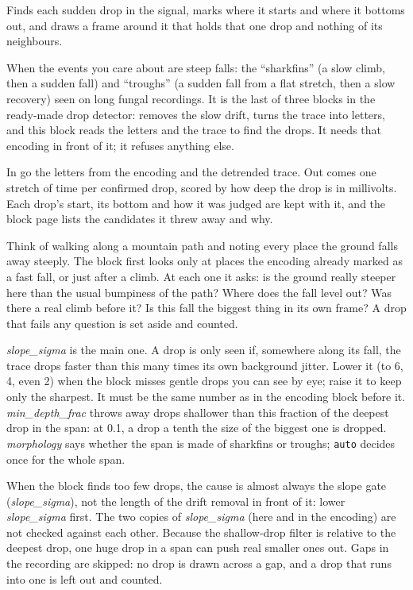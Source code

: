 Finds each sudden drop in the signal, marks where it starts and where it bottoms out, and
draws a frame around it that holds that one drop and nothing of its neighbours.

When the events you care about are steep falls: the ``sharkfins'' (a slow climb, then a
sudden fall) and ``troughs'' (a sudden fall from a flat stretch, then a slow recovery) seen on
long fungal recordings. It is the last of three blocks in the ready-made drop detector:
 removes the slow drift, 
turns the trace into letters, and this block reads the letters and the trace to find the
drops. It needs that encoding in front of it; it refuses anything else.

In go the letters from the encoding and the detrended trace. Out comes one stretch of time
per confirmed drop, scored by how deep the drop is in millivolts. Each drop's start, its
bottom and how it was judged are kept with it, and the block page lists the candidates it
threw away and why.

\begin{plainterms}
Think of walking along a mountain path and noting every place the ground falls away
steeply. The block first looks only at places the encoding already marked as a fast fall, or
just after a climb. At each one it asks: is the ground really steeper here than the usual
bumpiness of the path? Where does the fall level out? Was there a real climb before it? Is
this fall the biggest thing in its own frame? A drop that fails any question is set aside and
counted.
\end{plainterms}

\emph{slope\_sigma} is the main one. A drop is only seen if, somewhere along its fall, the
trace drops faster than this many times its own background jitter. Lower it (to 6, 4, even 2)
when the block misses gentle drops you can see by eye; raise it to keep only the sharpest.
It must be the same number as in the encoding block before it. \emph{min\_depth\_frac}
throws away drops shallower than this fraction of the deepest drop in the span: at 0.1, a
drop a tenth the size of the biggest one is dropped. \emph{morphology} says whether the span
is made of sharkfins or troughs; \texttt{auto} decides once for the whole span.

When the block finds too few drops, the cause is almost always the slope gate
(\emph{slope\_sigma}), not the length of the drift removal in front of it: lower
\emph{slope\_sigma} first. The two copies of \emph{slope\_sigma} (here and in the encoding)
are not checked against each other. Because the shallow-drop filter is relative to the
deepest drop, one huge drop in a span can push real smaller ones out. Gaps in the recording
are skipped: no drop is drawn across a gap, and a drop that runs into one is left out and
counted.
